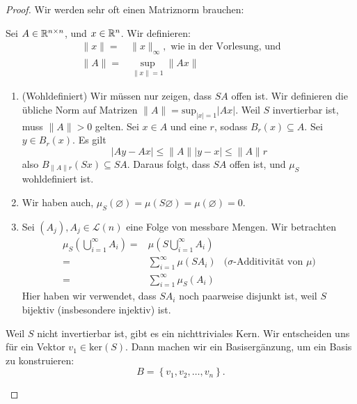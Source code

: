 \begin{proof}
	Wir werden sehr oft einen Matriznorm brauchen:
	\begin{tcolorbox}[title=Matriz $\infty$-Norm]
		Sei  $A\in \mathbb{R}^{n\times n}$, und $x\in \mathbb{R}^n$. Wir definieren:
		\begin{align*}
			\|x\|=&\|x\|_{\infty},\text{ wie in der Vorlesung, und}\\
			\|A\|=&\sup_{\|x\|=1}\|Ax\|
		\end{align*}
	\end{tcolorbox}
\begin{parts}
\item 
	\begin{enumerate}[label=(\roman*)]
		\item (Wohldefiniert) Wir müssen nur zeigen, dass $SA$ offen ist. Wir definieren die übliche Norm auf Matrizen $\|A\|=\text{sup}_{|x|=1}|Ax|$. Weil $S$ invertierbar ist, muss $\|A\|>0$ gelten. Sei $x\in A$ und eine $r$, sodass $B_r(x)\subseteq A$. Sei $y\in B_r(x)$. Es gilt
			\[
			|Ay-Ax|\le \|A\| |y-x|\le \|A\|r
		\]
		also $B_{\|A\|r}(Sx)\subseteq SA$. Daraus folgt, dass $SA$ offen ist, und $\mu_S$ wohldefiniert ist.
	\item Wir haben auch, $\mu_S(\varnothing)=\mu(S\varnothing)=\mu(\varnothing)=0$.
	\item Sei  $(A_j), A_j\in \mathcal{L}(n)$ eine Folge von messbare Mengen. Wir betrachten
		\begin{align*}
			\mu_S\left(\bigcup_{i=1} ^\infty A_i\right)=&\mu\left( S\bigcup_{i=1}^\infty A_i\right) \\
			=& \sum_{i=1}^{\infty} \mu(SA_i) &(\sigma\text{-Additivität von $\mu$)}\\
			=&  \sum_{i=1}^{\infty} \mu_S(A_i)
		\end{align*}
		Hier haben wir verwendet, dass $SA_i$ noch paarweise disjunkt ist, weil $S$ bijektiv (insbesondere injektiv) ist.
	\end{enumerate}
\item Weil $S$ nicht invertierbar ist, gibt es ein nichttriviales Kern. Wir entscheiden uns f\"{u}r ein Vektor $v_1\in \text{ker}(S)$. Dann machen wir ein Basisergänzung, um ein Basis zu konstruieren:
	\[
	B=\left\{ v_1,v_2,\dots, v_n \right\} 
	.\] 
\end{parts}	
\end{proof}
